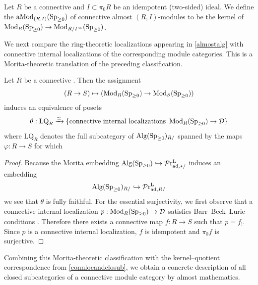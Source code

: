 \documentclass[a4paper,10pt, oneside]{amsart}
\begin{document}
	
	\begin{de}
		Let $R$ be a connective \eonering and $I\subset \pi_0R$ be an idempotent (two-sided) ideal. We define the \infcat $\operatorname{aMod}_{(R,I)}(\operatorname{Sp}_{\geq0})$ of connective almost $(R,I)$-modules  to be the kernel of $\operatorname{Mod}_R(\operatorname{Sp}_{\geq0})\to \operatorname{Mod}_{R/I^\infty}(\operatorname{Sp}_{\geq0})$.
	\end{de}
	We next compare the ring-theoretic localizations appearing in \cref{almostalg} with connective internal localizations of the corresponding module categories. This is a Morita-theoretic translation of the preceding classification.
		\begin{lem}\label{classsub}
		Let $R$ be a connective \eonering. Then the assignment $$(R\to S)\mapsto (\operatorname{Mod}_{R}(\operatorname{Sp}_{\geq0})\to\operatorname{Mod}_{S}(\operatorname{Sp}_{\geq0}))$$ induces an equivalence of posets
		$$\theta:\mathrm{LQ}_R\xrightarrow{\simeq} \{\text{connective internal localizations } \operatorname{Mod}_{R}(\operatorname{Sp}_{\geq0})\to \mathcal{D}\}$$ where $\mathrm{LQ}_R$ denotes the full subcategory  of $ \mathrm{Alg}(\operatorname{Sp}_{\geq0})_{R /}$ spanned by the maps $\varphi: R \rightarrow S$ for which
	\end{lem}
	\begin{proof}
		Because the Morita embedding $\operatorname{Alg}(\operatorname{Sp}_{\geq0})\hookrightarrow \mathcal{P}\mathrm{r}^\mathrm{L}_{\mathrm{ad},*/}$
		\cite[see][.5]{ha} induces an embedding 
		$$\operatorname{Alg}(\operatorname{Sp}_{\geq0})_{R/}\hookrightarrow \mathcal{P}\mathrm{r}^\mathrm{L}_{\mathrm{ad},R/} $$ we see that $\theta$ 
		is fully faithful. For the essential surjectivity, we first observe that a 
		connective internal localization $p:\operatorname{Mod}_{R}(\operatorname{Sp}_{\geq0})\to \mathcal{D}$ satisfies Barr--Beck--Lurie
		 conditions \cite[Theorem 4.7.3.5]{ha}. Therefore there exists a connective 
		 \eonering map $f:R\to S$ such that $p=f_!$. Since $p$ is a connective internal localization, $f$ is 
		 idempotent and $\pi_0f$ is surjective.
	\end{proof}
	
	Combining this Morita-theoretic classification with the kernel--quotient correspondence from \cref{connlocandclosub}, we obtain a concrete description of all closed subcategories of a connective module category by almost mathematics.
	
\end{document}

